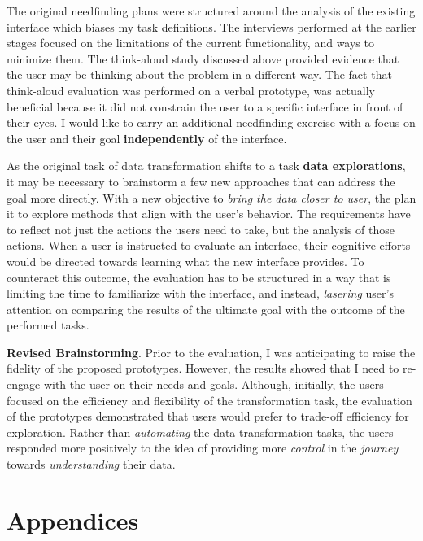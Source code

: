 \documentclass[12pt,letterpaper]{article}
\begin{document}
The original needfinding plans were structured around the analysis of the existing interface which biases my task definitions. The interviews performed at the earlier stages focused on the limitations of the current functionality, and ways to minimize them. The think-aloud study discussed above provided evidence that the user may be thinking about the problem in a different way. The fact that think-aloud evaluation was performed on a verbal prototype, was actually beneficial because it did not constrain the user to a specific interface in front of their eyes. I would like to carry an additional needfinding exercise with a focus on the user and their goal \textbf{independently} of the interface.  


As the original task of data transformation shifts to a task \textbf{data explorations}, it may be necessary to brainstorm a few new approaches that can address the goal more directly. With a new objective to \textit{bring the data closer to user}, the plan it to explore methods that align with the user's behavior. The requirements have to reflect not just the actions the users need to take, but the analysis of those actions. When a user is instructed to evaluate an interface, their cognitive efforts would be directed towards learning what the new interface provides. To counteract this outcome, the evaluation has to be structured in a way that is limiting the time to familiarize with the interface, and instead, \textit{lasering} user's attention on comparing the results of the ultimate goal with the outcome of the performed tasks.  

\textbf{Revised Brainstorming}. Prior to the evaluation, I was anticipating to raise the fidelity of the proposed prototypes. However, the results showed that I need to re-engage with the user on their needs and goals. Although, initially, the users focused on the efficiency and flexibility of the transformation task, the evaluation of the prototypes demonstrated that users would prefer to trade-off efficiency for exploration. Rather than \textit{automating} the data transformation tasks, the users responded more positively to the idea of providing more \textit{control} in the \textit{journey} towards \textit{understanding} their data. 

 


\newpage
\section*{Appendices}
\end{document}

